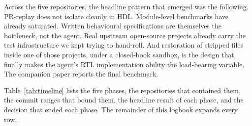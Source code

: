 \documentclass{article}
\begin{document}
Across the five repositories, the headline pattern that emerged was the following.
PR-replay does not isolate cleanly in HDL. Module-level benchmarks have already saturated.
Written behavioural specifications are themselves the bottleneck, not the agent. Real
upstream open-source projects already carry the test infrastructure we kept trying to
hand-roll. And restoration of stripped files inside one of those projects, under a
closed-book sandbox, is the design that finally makes the agent's RTL implementation
ability the load-bearing variable. The companion paper reports the final benchmark.

Table~\ref{tab:timeline} lists the five phases, the repositories that contained them, the
commit ranges that bound them, the headline result of each phase, and the decision that
ended each phase. The remainder of this logbook expands every row.
\end{document}
